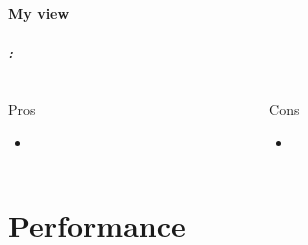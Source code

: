 \documentclass[9pt,xcolor=table]{beamer}
\begin{document}
\subsection{My view}
\begin{frame}[c]
\frametitle{\insertsectionhead{} : \insertsubsection}
\vspace{-1.\baselineskip}
\begin{columns}[t]
  \begin{column}{.48\textwidth}
    \begin{exampleblock}{Pros}
      \begin{itemize}
      \item
      \end{itemize}
    \end{exampleblock}
  \end{column}
  \begin{column}{.48\textwidth}
    \begin{alertblock}{Cons}
      \begin{itemize}
      \item
      \end{itemize}
    \end{alertblock}
  \end{column}
\end{columns}
\end{frame}

\part{Performance}
\end{document}

